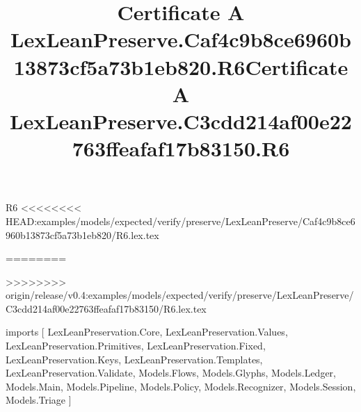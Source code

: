 \begin{lexlean}{R6}
<<<<<<<< HEAD:examples/models/expected/verify/preserve/LexLeanPreserve/Caf4c9b8ce6960b13873cf5a73b1eb820/R6.lex.tex
\title{Certificate A LexLeanPreserve.Caf4c9b8ce6960b13873cf5a73b1eb820.R6}
========
\title{Certificate A LexLeanPreserve.C3cdd214af00e22763ffeafaf17b83150.R6}
>>>>>>>> origin/release/v0.4:examples/models/expected/verify/preserve/LexLeanPreserve/C3cdd214af00e22763ffeafaf17b83150/R6.lex.tex
\begin{coremodule}
imports [
  LexLeanPreservation.Core,
  LexLeanPreservation.Values,
  LexLeanPreservation.Primitives,
  LexLeanPreservation.Fixed,
  LexLeanPreservation.Keys,
  LexLeanPreservation.Templates,
  LexLeanPreservation.Validate,
  Models.Flows,
  Models.Glyphs,
  Models.Ledger,
  Models.Main,
  Models.Pipeline,
  Models.Policy,
  Models.Recognizer,
  Models.Session,
  Models.Triage
]


\end{coremodule}
\end{lexlean}
